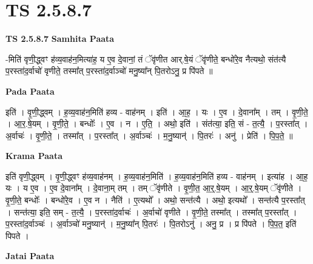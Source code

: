 \documentclass[17pt]{extarticle}
\begin{document}
\section{ TS 2.5.8.7 }

\textbf{TS 2.5.8.7 } \newline
\textbf{Samhita Paata} \newline

-मिति॑ वृणी॒द्ध्वꣳ ह॑व्य॒वाह॑न॒मित्या॑ह॒ य ए॒व दे॒वानां॒ तं ॅवृ॑णीत आर्.षे॒यं ॅवृ॑णीते॒ बन्धो॑रे॒व नैत्यथो॒ संत॑त्यै प॒रस्ता॑द॒र्वाचो॑ वृणीते॒ तस्मा᳚त् प॒रस्ता॑द॒र्वाञ्चो॑ मनु॒ष्या᳚न् पि॒तरोऽनु॒ प्र पि॑पते ॥ \newline

\textbf{Pada Paata} \newline

इति॑ । वृ॒णी॒द्ध्वम् । ह॒व्य॒वाह॑न॒मिति॑ हव्य - वाह॑नम् । इति॑ । आ॒ह॒ । यः । ए॒व । दे॒वाना᳚म् । तम् । वृ॒णी॒ते॒ । आ॒र॒.षे॒यम् । वृ॒णी॒ते॒ । बन्धोः᳚ । ए॒व । न । ए॒ति॒ । अथो॒ इति॑ । संत॑त्या॒ इति॒ सं - त॒त्यै॒ । प॒रस्ता᳚त् । अ॒र्वाचः॑ । वृ॒णी॒ते॒ । तस्मा᳚त् । प॒रस्ता᳚त् । अ॒र्वाञ्चः॑ । म॒नु॒ष्यान्॑ । पि॒तरः॑ । अनु॑ । प्रेति॑ । पि॒प॒ते॒ ॥  \newline


\textbf{Krama Paata} \newline

इति॑ वृणी॒द्ध्वम् । वृ॒णी॒द्ध्वꣳ ह॑व्य॒वाह॑नम् । ह॒व्य॒वाह॑न॒मिति॑ । ह॒व्य॒वाह॑न॒मिति॑ हव्य - वाह॑नम् । इत्या॑ह । आ॒ह॒ यः । य ए॒व । ए॒व दे॒वाना᳚म् । दे॒वाना॒म् तम् । तम् ॅवृ॑णीते । वृ॒णी॒त॒ आ॒र्॒.षे॒यम् । आ॒र्॒.षे॒यम् ॅवृ॑णीते । वृ॒णी॒ते॒ बन्धोः᳚ । बन्धो॑रे॒व । ए॒व न । नैति॑ । ए॒त्यथो᳚ । अथो॒ सन्त॑त्यै । अथो॒ इत्यथो᳚ । सन्त॑त्यै प॒रस्ता᳚त् । सन्त॑त्या॒ इति॒ सम् - त॒त्यै॒ । प॒रस्ता॑द॒र्वाचः॑ । अ॒र्वाचो॑ वृणीते । वृ॒णी॒ते॒ तस्मा᳚त् । तस्मा᳚त् प॒रस्ता᳚त् । प॒रस्ता॑द॒र्वाञ्चः॑ । अ॒र्वाञ्चो॑ मनु॒ष्यान्॑ । म॒नु॒ष्या᳚न् पि॒तरः॑ । पि॒तरोऽनु॑ । अनु॒ प्र । प्र पि॑पते । पि॒प॒त॒ इति॑ पिपते । \newline

\textbf{Jatai Paata} \newline
\end{document}
